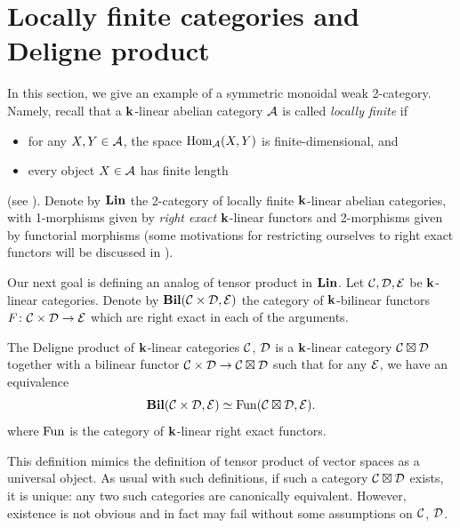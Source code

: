 \section{Locally finite categories and Deligne product}
\label{s:deligne-product}
In this section, we give an example of a symmetric monoidal weak 2-category.
Namely, recall that a $\mathbf{k}$-linear abelian category $\mathcal{A}$ is called
\emph{locally finite} if
\begin{itemize}
    \item for any $X,Y\in \mathcal{A}$, the space $\operatorname{Hom}_{\mathcal{A}}(X,Y)$ is
      finite-dimensional, and
    \item every object $X\in \mathcal{A}$ has finite length
\end{itemize}
(see \cite[Section 1.8]{etingof-fusion}). Denote by $\mathbf{Lin}$ the 2-category
of locally finite $\mathbf{k}$-linear abelian categories, with 1-morphisms given by
\emph{right exact} $\mathbf{k}$-linear functors and 2-morphisms given by functorial
morphisms (some motivations for restricting ourselves to right exact
functors will be discussed in ). %


Our next goal is defining an analog of tensor product in $\mathbf{Lin}$.
Let $\mathcal{C}, \mathcal{D}, \mathcal{E}$ be $\mathbf{k}$-linear categories. Denote by
$\mathbf{Bil}(\mathcal{C}\times\mathcal{D}, \mathcal{E})$ the category of $\mathbf{k}$-bilinear functors $F\colon
\mathcal{C}\times\mathcal{D}\to \mathcal{E}$ which are right exact in each of the arguments.

\begin{definition}\label{d:deligne-product}
  The Deligne product of $\mathbf{k}$-linear categories $\mathcal{C}$, $\mathcal{D}$ is a
  $\mathbf{k}$-linear category $\mathcal{C}\boxtimes \mathcal{D}$ together with a bilinear functor
  $\mathcal{C}\times\mathcal{D}\to \mathcal{C}\boxtimes\mathcal{D}$ such that for any $\mathcal{E}$, we have
  an equivalence
  $$
    \mathbf{Bil}(\mathcal{C}\times\mathcal{D}, \mathcal{E})\simeq \operatorname{Fun}(\mathcal{C}\boxtimes\mathcal{D}, \mathcal{E}).
  $$
  where $\operatorname{Fun}$ is the category of $\mathbf{k}$-linear right exact functors.
\end{definition}
This definition mimics the definition of tensor product of vector spaces as a
universal object. As usual with such definitions, if such a category
$\mathcal{C}\boxtimes\mathcal{D}$ exists, it is unique: any two such categories are
canonically equivalent. However, existence is not obvious and in fact may fail
without some assumptions on $\mathcal{C}$, $\mathcal{D}$.

